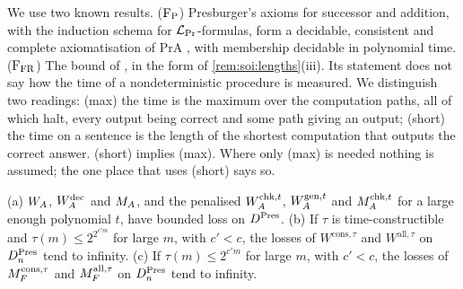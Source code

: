 We use two known results. ($\mathrm F_{\rm P}$) Presburger's axioms for successor and addition, with the induction schema for $\mathcal L_{\rm Pr}$-formulas, form a decidable, consistent and complete axiomatisation of $\mathrm{PrA}$ \citep{presburger1929vollstandigkeit}, with membership decidable in polynomial time. ($\mathrm F_{\rm FR}$) The bound of \citet{fischer1974super}, in the form of \cref{rem:soi:lengths}(iii). Its statement does not say how the time of a nondeterministic procedure is measured. We distinguish two readings: (max) the time is the maximum over the computation paths, all of which halt, every output being correct and some path giving an output; (short) the time on a sentence is the length of the shortest computation that outputs the correct answer. (short) implies (max). Where only (max) is needed nothing is assumed; the one place that uses (short) says so.

\begin{proposition}\label{prop:soi:presburger}
(a) $W_{A}$, $W_{A}^{\mathrm{dec}}$ and $M_{A}$, and the penalised $W_{A}^{\mathrm{chk},t}$, $W_{A}^{\mathrm{gen},t}$ and $M_{A}^{\mathrm{chk},t}$ for a large enough polynomial $t$, have bounded loss on $D^{\rm Pres}$.
(b) If $\tau$ is time-constructible and $\tau(m)\le2^{2^{c'm}}$ for large $m$, with $c'<c$, the losses of $W^{\mathrm{cons},\tau}$ and $W^{\mathrm{all},\tau}$ on $D^{\rm Pres}_n$ tend to infinity.
(c) If $\tau(m)\le2^{c'm}$ for large $m$, with $c'<c$, the losses of $M_{F}^{\mathrm{cons},\tau}$ and $M_{F}^{\mathrm{all},\tau}$ on $D^{\rm Pres}_n$ tend to infinity.
\end{proposition}

